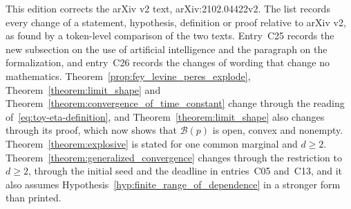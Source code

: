 \documentclass[12pt]{amsart}
\begin{document}
This edition corrects the arXiv v2 text, arXiv:2102.04422v2. The list records every change of a statement, hypothesis, definition or proof relative to arXiv v2, as found by a token-level comparison of the two texts. Entry~C25 records the new subsection on the use of artificial intelligence and the paragraph on the formalization, and entry~C26 records the changes of wording that change no mathematics. Theorem~\ref{prop:fey_levine_peres_explode}, Theorem~\ref{theorem:limit_shape} and Theorem~\ref{theorem:convergence_of_time_constant} change through the reading of~\eqref{eq:toy-eta-definition}, and Theorem~\ref{theorem:limit_shape} also changes through its proof, which now shows that $\mathcal B(p)$ is open, convex and nonempty. Theorem~\ref{theorem:explosive} is stated for one common marginal and $d\geq2$. Theorem~\ref{theorem:generalized_convergence} changes through the restriction to $d\geq2$, through the initial seed and the deadline in entries~C05 and~C13, and it also assumes Hypothesis~\ref{hyp:finite_range_of_dependence} in a stronger form than printed.
\end{document}
